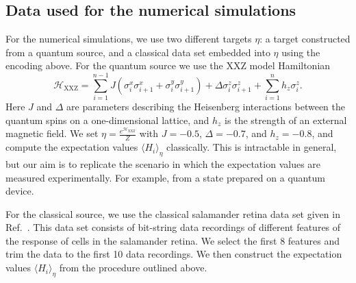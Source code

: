\documentclass[
    reprint,
    aps,
    prx,
    longbibliography
]{revtex4-2}
\begin{document}
\subsection*{Data used for the numerical simulations}

For the numerical simulations, we use two different targets $\eta$: a target constructed from a quantum source, and a classical data set embedded into $\eta$ using the encoding above. For the quantum source we use the XXZ model Hamiltonian 
\begin{equation}
\label{eq:xxz}
    \mathcal{H}_{\mathrm{XXZ}} =\sum_{i=1}^{n-1}J\left(\sigma^{x}_i\sigma^{x}_{i+1}+\sigma^y_i\sigma^y_{i+1}\right)+\Delta \sigma_i^z\sigma^z_{i+1} + \sum_{i=1}^n h_z \sigma_i^z.
\end{equation} 
Here $J$ and $\Delta$ are parameters describing the Heisenberg interactions between the quantum spins on a one-dimensional lattice, and $h_z$ is the strength of an external magnetic field. We set $\eta=\frac{e^{\mathcal{H}_{\mathrm{XXZ}}}}{Z}$ with $J=-0.5$, $\Delta=-0.7$, and $h_z =- 0.8$, and compute the expectation values $\langle H_i\rangle_\eta$ classically. This is intractable in general, but our aim is to replicate the scenario in which the expectation values are measured experimentally. For example, from a state prepared on a quantum device. 

For the classical source, we use the classical salamander retina data set given in Ref.~\cite{Tkacik2014}. This data set consists of bit-string data recordings of different features of the response of cells in the salamander retina. We select the first $8$ features and trim the data to the first 10 data recordings. We then construct the expectation values $\langle H_i \rangle_\eta$ from the procedure outlined above.
\end{document}
